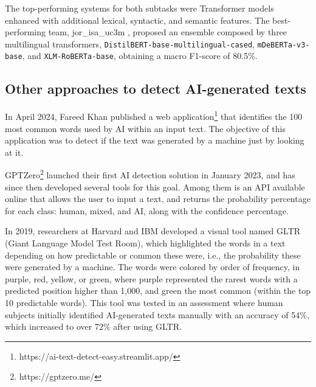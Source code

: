 \documentclass[a4paper,11pt,twocolumn,twoside]{article}
\begin{document}
The top-performing systems for both subtasks were Transformer models enhanced with additional lexical, syntactic, and semantic features.
The best-performing team, jor\_isa\_uc3m \cite{jor_isa_uc3m}, proposed an ensemble composed by three multilingual transformers, \texttt{DistilBERT-base-multilingual-cased}, \texttt{mDeBERTa-v3-base}, and \texttt{XLM-RoBERTa-base}, obtaining a macro F1-score of 80.5\%.

\subsection{Other approaches to detect AI-generated texts}
In April 2024, Fareed Khan published a web application\footnote{https://ai-text-detect-easy.streamlit.app/} that identifies the 100 most common words used by AI within an input text. The objective of this application was to detect if the text was generated by a machine just by looking at it.

GPTZero\footnote{https://gptzero.me/}\cite{tian2023gptzero} launched their first AI detection solution in January 2023, and has since then developed several tools for this goal. Among them is an API available online that allows the user to input a text, and returns the probability percentage for each class: human, mixed, and AI, along with the confidence percentage. %

In 2019, researchers at Harvard and IBM \cite{gehrmann-etal-2019-gltr} developed a visual tool named GLTR (Giant Language Model Test Room), which highlighted the words in a text depending on how predictable or common these were, i.e., the probability these were generated by a machine. %
The words were colored by order of frequency, in purple, red, yellow, or green, where purple represented the rarest words with a predicted position higher than 1,000, and green the most common (within the top 10 predictable words). This tool was tested in an assessment where human subjects initially identified AI-generated texts manually with an accuracy of 54\%, which increased to over 72\% after using GLTR.
\end{document}
